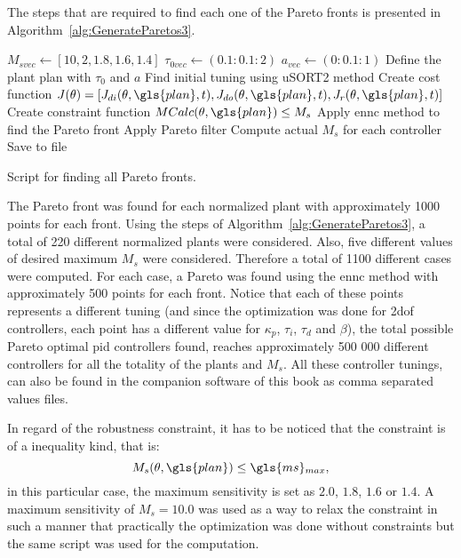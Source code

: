 The steps that are required to find each one of the Pareto fronts is presented in Algorithm~\ref{alg:GenerateParetos3}. %
%
\begin{algorithm}[tb]
	\begin{algorithmic}
		\State $M_{svec} \gets [10,2,1.8,1.6,1.4]$
		\State $\tau_{0vec} \gets (0.1:0.1:2)$
		\State $a_{vec} \gets (0:0.1:1)$
			\State Define the plant \gls{plan} with $\tau_{0}$ and $a$
			\State Find initial tuning  using uSORT2 method
			\State Create cost function $J(\theta) = [J_{di}(\theta, \gls{plan}, t),J_{do}(\theta, \gls{plan}, t),J_{r}(\theta, \gls{plan}, t) ]$
			\State Create constraint function $MCalc(\theta, \gls{plan}) \leq M_s$
			\State Apply \gls{ennc} method to find the Pareto front
			\State Apply Pareto filter
			\State Compute actual $M_s$ for each controller
			\State Save to file
		\EndFor
	\end{algorithmic}
\caption{Script for finding all Pareto fronts.}
\label{alg:GenerateParetos3}
\end{algorithm}
%
%
The Pareto front was found for each normalized plant with approximately 1000 points for each front. Using the steps of Algorithm~\ref{alg:GenerateParetos3}, a total of 220 different normalized plants were considered. Also, five different values of desired maximum $M_s$ were considered. Therefore a total of 1100 different cases were computed. For each case, a Pareto was found using the \gls{ennc} method with approximately 500 points for each front. Notice that each of these points represents a different tuning (and since the optimization was done for \gls{2dof} controllers, each point has a different value for $\kappa_p$, $\tau_i$, $\tau_d$ and $\beta$), the total possible Pareto optimal \gls{pid} controllers found, reaches approximately 500 000 different controllers for all the totality of the plants and $M_s$. All these controller tunings, can also be found in the companion software of this book as comma separated values files.

In regard of the robustness constraint, it has to be noticed that the constraint is of a inequality kind, that is:
\begin{equation*}
	M_s(\theta, \gls{plan}) \leq \gls{ms}\mbox{}_{max},
\end{equation*} 
in this particular case, the maximum sensitivity is set as $2.0$, $1.8$, $1.6$ or $1.4$. A maximum sensitivity of $M_s = 10.0$ was used as a way to relax the constraint in such a manner that practically the optimization was done without constraints but the same script was used for the computation.


